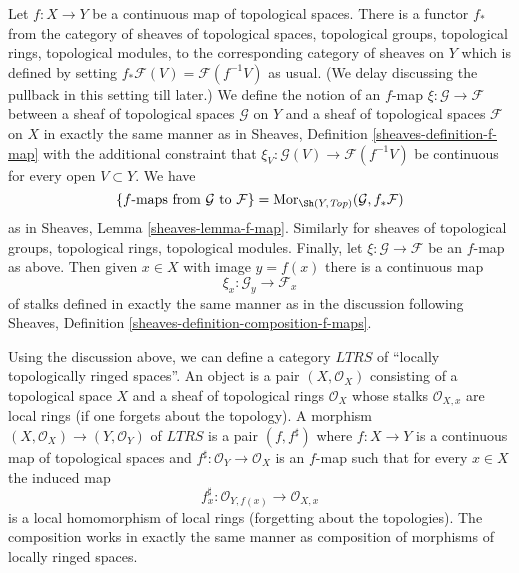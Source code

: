 \medskip\noindent
Let $f : X \to Y$ be a continuous map of topological spaces.
There is a functor $f_*$ from the category of sheaves of topological
spaces, topological groups, topological rings, topological modules,
to the corresponding category of sheaves on $Y$ which is defined by setting
$f_*\mathcal{F}(V) = \mathcal{F}(f^{-1}V)$ as usual.
(We delay discussing the pullback in this setting till later.)
We define the notion of an $f$-map $\xi : \mathcal{G} \to \mathcal{F}$
between a sheaf of topological spaces $\mathcal{G}$ on $Y$ and
a sheaf of topological spaces $\mathcal{F}$ on $X$ in exactly the
same manner as in Sheaves, Definition \ref{sheaves-definition-f-map}
with the additional constraint that
$\xi_V : \mathcal{G}(V) \to \mathcal{F}(f^{-1}V)$ be continuous
for every open $V \subset Y$. We have
$$
\{f\text{-maps from }\mathcal{G}\text{ to }\mathcal{F}\} =
\text{Mor}_{\Sh(Y, \textit{Top})}(\mathcal{G}, f_*\mathcal{F})
$$
as in Sheaves, Lemma \ref{sheaves-lemma-f-map}. Similarly for
sheaves of topological groups, topological rings, topological modules. Finally,
let $\xi : \mathcal{G} \to \mathcal{F}$ be an $f$-map as above.
Then given $x \in X$ with image $y = f(x)$ there is a continuous
map
$$
\xi_x : \mathcal{G}_y \longrightarrow \mathcal{F}_x
$$
of stalks defined in exactly the same manner as in the discussion
following Sheaves, Definition \ref{sheaves-definition-composition-f-maps}.

\medskip\noindent
Using the discussion above, we can define a category $LTRS$ of
``locally topologically ringed spaces''. An object is a pair
$(X, \mathcal{O}_X)$ consisting of a topological space
$X$ and a sheaf of topological rings $\mathcal{O}_X$ whose stalks
$\mathcal{O}_{X, x}$ are local rings (if one forgets about the topology).
A morphism $(X, \mathcal{O}_X) \to (Y, \mathcal{O}_Y)$ of
$LTRS$ is a pair $(f, f^\sharp)$ where $f : X \to Y$ is a continuous
map of topological spaces and $f^\sharp : \mathcal{O}_Y \to \mathcal{O}_X$
is an $f$-map such that for every $x \in X$ the induced map
$$
f^\sharp_x : \mathcal{O}_{Y, f(x)} \longrightarrow \mathcal{O}_{X, x}
$$
is a local homomorphism of local rings (forgetting about the topologies).
The composition works in exactly the same manner as composition of
morphisms of locally ringed spaces.

